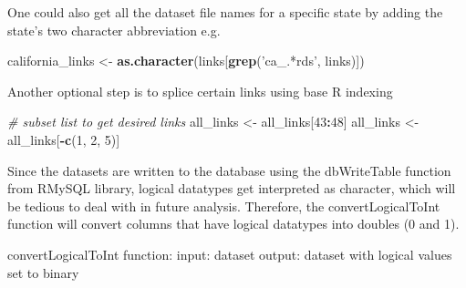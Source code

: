 \documentclass[
]{book}
\newenvironment{Shaded}{\begin{snugshade}}{\end{snugshade}}
\newcommand{\CommentTok}[1]{\textcolor[rgb]{0.56,0.35,0.01}{\textit{#1}}}
\newcommand{\ControlFlowTok}[1]{\textcolor[rgb]{0.13,0.29,0.53}{\textbf{#1}}}
\newcommand{\DecValTok}[1]{\textcolor[rgb]{0.00,0.00,0.81}{#1}}
\newcommand{\KeywordTok}[1]{\textcolor[rgb]{0.13,0.29,0.53}{\textbf{#1}}}
\newcommand{\NormalTok}[1]{#1}
\newcommand{\OperatorTok}[1]{\textcolor[rgb]{0.81,0.36,0.00}{\textbf{#1}}}
\newcommand{\StringTok}[1]{\textcolor[rgb]{0.31,0.60,0.02}{#1}}
\begin{document}
One could also get all the dataset file names for a specific state by adding the state's two character abbreviation e.g.

\begin{Shaded}
\begin{Highlighting}[]
\NormalTok{california_links <-}\StringTok{ }\KeywordTok{as.character}\NormalTok{(links[}\KeywordTok{grep}\NormalTok{(}\StringTok{'ca_.*rds'}\NormalTok{, links)])}
\end{Highlighting}
\end{Shaded}

Another optional step is to splice certain links using base R indexing

\begin{Shaded}
\begin{Highlighting}[]
\CommentTok{# subset list to get desired links}
\NormalTok{all_links <-}\StringTok{ }\NormalTok{all_links[}\DecValTok{43}\OperatorTok{:}\DecValTok{48}\NormalTok{]}
\NormalTok{all_links <-}\StringTok{ }\NormalTok{all_links[}\OperatorTok{-}\KeywordTok{c}\NormalTok{(}\DecValTok{1}\NormalTok{, }\DecValTok{2}\NormalTok{, }\DecValTok{5}\NormalTok{)]}
\end{Highlighting}
\end{Shaded}

Since the datasets are written to the database using the dbWriteTable function from RMySQL library, logical datatypes get interpreted as character, which will be tedious to deal with in future analysis. Therefore, the convertLogicalToInt function will convert columns that have logical datatypes into doubles (0 and 1).

convertLogicalToInt function:
input: dataset
output: dataset with logical values set to binary

\begin{Shaded}
\end{Shaded}
\end{document}
